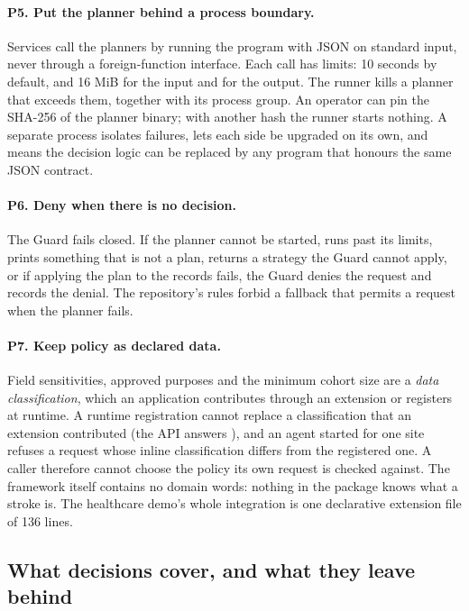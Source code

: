 \paragraph{P5. Put the planner behind a process boundary.} Services call the
planners by running the  program with JSON on standard input,
never through a foreign-function interface. Each call has limits: 10 seconds by
default, and 16 MiB for the input and for the output. The runner kills a planner
that exceeds them, together with its process group. An operator can pin the
SHA-256 of the planner binary; with another hash the runner starts nothing. A
separate process isolates failures, lets each side be upgraded on its own, and
means the decision logic can be replaced by any program that honours the same
JSON contract.

\paragraph{P6. Deny when there is no decision.} The Guard fails closed. If the
planner cannot be started, runs past its limits, prints something that is not a
plan, returns a strategy the Guard cannot apply, or if applying the plan to the
records fails, the Guard denies the request and records the denial. The
repository's rules forbid a fallback that permits a request when the planner
fails.

\paragraph{P7. Keep policy as declared data.} Field sensitivities, approved
purposes and the minimum cohort size are a \emph{data classification}, which an
application contributes through an extension or registers at runtime. A runtime
registration cannot replace a classification that an extension contributed (the
API answers ), and an agent started for one site refuses a request
whose inline classification differs from the registered one. A caller therefore
cannot choose the policy its own request is checked against. The framework
itself contains no domain words: nothing in the  package knows
what a stroke is. The healthcare demo's whole integration is one declarative
extension file of 136 lines.

\subsection{What decisions cover, and what they leave behind}

